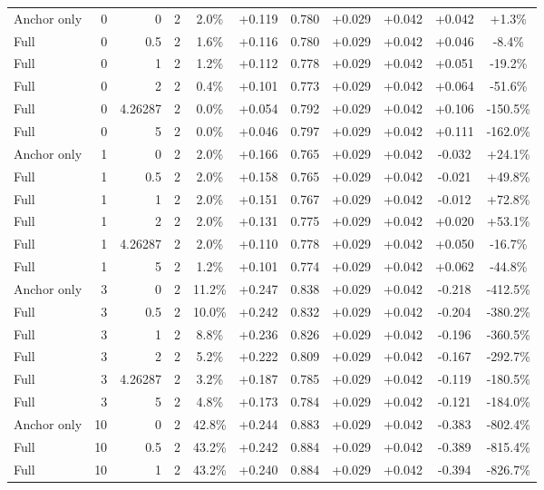 \begin{table}[htbp]
\begin{tabular}{lrrrccccccc}
Anchor only & 0 & 0 & 2 & 2.0\% & +0.119 & 0.780 & +0.029 & +0.042 & +0.042 & +1.3\% \\
Full & 0 & 0.5 & 2 & 1.6\% & +0.116 & 0.780 & +0.029 & +0.042 & +0.046 & -8.4\% \\
Full & 0 & 1 & 2 & 1.2\% & +0.112 & 0.778 & +0.029 & +0.042 & +0.051 & -19.2\% \\
Full & 0 & 2 & 2 & 0.4\% & +0.101 & 0.773 & +0.029 & +0.042 & +0.064 & -51.6\% \\
Full & 0 & 4.26287 & 2 & 0.0\% & +0.054 & 0.792 & +0.029 & +0.042 & +0.106 & -150.5\% \\
Full & 0 & 5 & 2 & 0.0\% & +0.046 & 0.797 & +0.029 & +0.042 & +0.111 & -162.0\% \\
Anchor only & 1 & 0 & 2 & 2.0\% & +0.166 & 0.765 & +0.029 & +0.042 & -0.032 & +24.1\% \\
Full & 1 & 0.5 & 2 & 2.0\% & +0.158 & 0.765 & +0.029 & +0.042 & -0.021 & +49.8\% \\
Full & 1 & 1 & 2 & 2.0\% & +0.151 & 0.767 & +0.029 & +0.042 & -0.012 & +72.8\% \\
Full & 1 & 2 & 2 & 2.0\% & +0.131 & 0.775 & +0.029 & +0.042 & +0.020 & +53.1\% \\
Full & 1 & 4.26287 & 2 & 2.0\% & +0.110 & 0.778 & +0.029 & +0.042 & +0.050 & -16.7\% \\
Full & 1 & 5 & 2 & 1.2\% & +0.101 & 0.774 & +0.029 & +0.042 & +0.062 & -44.8\% \\
Anchor only & 3 & 0 & 2 & 11.2\% & +0.247 & 0.838 & +0.029 & +0.042 & -0.218 & -412.5\% \\
Full & 3 & 0.5 & 2 & 10.0\% & +0.242 & 0.832 & +0.029 & +0.042 & -0.204 & -380.2\% \\
Full & 3 & 1 & 2 & 8.8\% & +0.236 & 0.826 & +0.029 & +0.042 & -0.196 & -360.5\% \\
Full & 3 & 2 & 2 & 5.2\% & +0.222 & 0.809 & +0.029 & +0.042 & -0.167 & -292.7\% \\
Full & 3 & 4.26287 & 2 & 3.2\% & +0.187 & 0.785 & +0.029 & +0.042 & -0.119 & -180.5\% \\
Full & 3 & 5 & 2 & 4.8\% & +0.173 & 0.784 & +0.029 & +0.042 & -0.121 & -184.0\% \\
Anchor only & 10 & 0 & 2 & 42.8\% & +0.244 & 0.883 & +0.029 & +0.042 & -0.383 & -802.4\% \\
Full & 10 & 0.5 & 2 & 43.2\% & +0.242 & 0.884 & +0.029 & +0.042 & -0.389 & -815.4\% \\
Full & 10 & 1 & 2 & 43.2\% & +0.240 & 0.884 & +0.029 & +0.042 & -0.394 & -826.7\% \\

\end{tabular}
\end{table}

